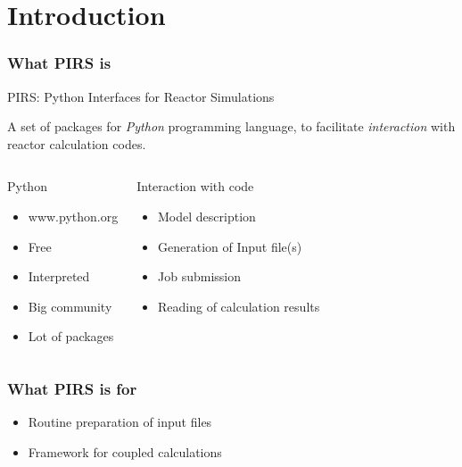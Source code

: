 \documentclass[t]{beamer}
\begin{document}
\section{Introduction}
\begin{frame}\frametitle{What PIRS is}

    \begin{block}{PIRS: Python Interfaces for Reactor Simulations}

    A set of packages for \emph{Python} programming language, to facilitate
    \emph{interaction} with reactor calculation codes.
    \end{block}

    \begin{columns}
    \begin{block}{Python}
    \begin{itemize}

        \item www.python.org

        \item Free 

        \item Interpreted

        \item Big community

        \item Lot of packages 

    \end{itemize}
    \end{block}

    \begin{block}{Interaction with code}
    \begin{itemize}
        
        \item Model description

        \item Generation of Input file(s)

        \item Job submission

        \item Reading of calculation results

    \end{itemize}
    \end{block}
    \end{columns}
\end{frame}

\begin{frame}\frametitle{What PIRS is for}    

    
    \begin{itemize}

    \item Routine preparation of input files 

    \item Framework for coupled calculations

    \end{itemize}

\end{frame}
\end{document}
